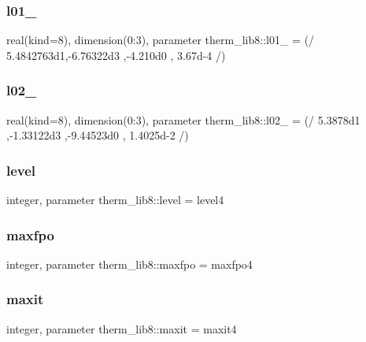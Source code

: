 \subsubsection{\texorpdfstring{l01\+\_}{l01\_108}}
{\footnotesize\ttfamily real(kind=8), dimension(0\+:3), parameter therm\+\_\+lib8\+::l01\+\_ = (/ 5.\+4842763d1,-\/6.\+76322d3 ,-\/4.\+210d0 , 3.\+67d-\/4 /)}

\mbox{\label{namespacetherm__lib8_ab6c640a78c761844912d94aac7c317b8}} 
\subsubsection{\texorpdfstring{l02\+\_}{l02\_108}}
{\footnotesize\ttfamily real(kind=8), dimension(0\+:3), parameter therm\+\_\+lib8\+::l02\+\_ = (/ 5.\+3878d1 ,-\/1.\+33122d3 ,-\/9.\+44523d0 , 1.\+4025d-\/2 /)}

\mbox{\label{namespacetherm__lib8_a5aa70fb6d66e28229c98896efb7d03d9}} 
\subsubsection{\texorpdfstring{level}{level}}
{\footnotesize\ttfamily integer, parameter therm\+\_\+lib8\+::level = level4}

\mbox{\label{namespacetherm__lib8_ae43667eb586a48e36ec5508be0a58153}} 
\subsubsection{\texorpdfstring{maxfpo}{maxfpo}}
{\footnotesize\ttfamily integer, parameter therm\+\_\+lib8\+::maxfpo = maxfpo4}

\mbox{\label{namespacetherm__lib8_a1fff65e6f008a88c6c8ebecbc85f518c}} 
\subsubsection{\texorpdfstring{maxit}{maxit}}
{\footnotesize\ttfamily integer, parameter therm\+\_\+lib8\+::maxit = maxit4}

